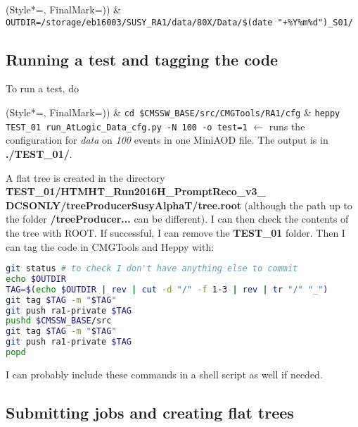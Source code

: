 
\begin{easylist}
\ListProperties(Style*=, FinalMark={)})
& \texttt{OUTDIR=/storage/eb16003/SUSY\_RA1/data/80X/Data/\$(date "+\%Y\%m\%d")\_S01/}
\end{easylist}

\subsection{Running a test and tagging the code}

To run a test, do

\begin{easylist}
\ListProperties(Style*=, FinalMark={)})
& \verb!cd $CMSSW_BASE/src/CMGTools/RA1/cfg!
& \verb!heppy TEST_01 run_AtLogic_Data_cfg.py -N 100 -o test=1! $\leftarrow$ runs the configuration for \emph{data} on \emph{100} events in one MiniAOD file. The output is in \textbf{./TEST\_01/}.
\end{easylist}

A flat tree is created in the directory \textbf{TEST\_01/HTMHT\_Run2016H\_PromptReco\_v3\_
DCSONLY/treeProducerSusyAlphaT/tree.root} (although the path up to the folder \textbf{/treeProducer...} can be different). I can then check the contents of the tree with ROOT. If successful, I can remove the \textbf{TEST\_01} folder. Then I can tag the code in CMGTools and Heppy with:

\begin{lstlisting}[belowskip=-0.7cm, language=sh, numbers=none]
git status # to check I don't have anything else to commit
echo $OUTDIR
TAG=$(echo $OUTDIR | rev | cut -d "/" -f 1-3 | rev | tr "/" "_")
git tag $TAG -m "$TAG"
git push ra1-private $TAG
pushd $CMSSW_BASE/src
git tag $TAG -m "$TAG"
git push ra1-private $TAG
popd
\end{lstlisting}

I can probably include these commands in a shell script as well if needed.

\subsection{Submitting jobs and creating flat trees}


